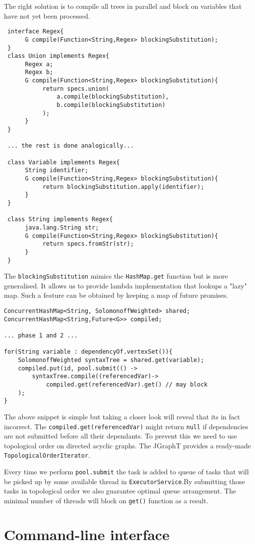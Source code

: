  The right solution is to compile all trees in parallel and block on variables that have not yet been processed.
 \begin{lstlisting}
 interface Regex{
      G compile(Function<String,Regex> blockingSubstitution);
 }
 class Union implements Regex{
      Regex a; 
      Regex b;
      G compile(Function<String,Regex> blockingSubstitution){
           return specs.union(
               a.compile(blockingSubstitution),
               b.compile(blockingSubstitution)
           );
      }
 }
 
 ... the rest is done analogically...
 
 class Variable implements Regex{
      String identifier;
      G compile(Function<String,Regex> blockingSubstitution){
           return blockingSubstitution.apply(identifier);
      }
 }
 
 class String implements Regex{
      java.lang.String str;
      G compile(Function<String,Regex> blockingSubstitution){
           return specs.fromStr(str);
      }
 }
\end{lstlisting}
The \texttt{blockingSubstitution} mimics the \texttt{HashMap.get} function but is more generalised. It allows us to provide lambda implementation 
that lookups a "lazy" map. Such a feature can be obtained by keeping a map of future promises. 
\begin{lstlisting}
ConcurrentHashMap<String, SolomonoffWeighted> shared;
ConcurrentHashMap<String,Future<G>> compiled;

... phase 1 and 2 ...

for(String variable : dependencyOf.vertexSet()){
	SolomonoffWeighted syntaxTree = shared.get(variable);
    compiled.put(id, pool.submit(() -> 
        syntaxTree.compile((referencedVar)->
            compiled.get(referencedVar).get() // may block
    );
}
\end{lstlisting}
The above snippet is simple but taking a closer look will reveal that its in fact incorrect. The \texttt{compiled.get(referencedVar)} might return \texttt{null} if
dependencies are not submitted before all their dependants. To prevent this we need to use topological order on directed acyclic graphs. The JGraphT provides a ready-made \texttt{TopologicalOrderIterator}. 

Every time we perform \texttt{pool.submit} the task is added to queue of tasks that will be picked up by some available thread in \texttt{ExecutorService}.By submitting those tasks in topological order we also guarantee optimal queue arrangement. The minimal number of threads will block on \texttt{get()} function as a result.

\section{Command-line interface}


